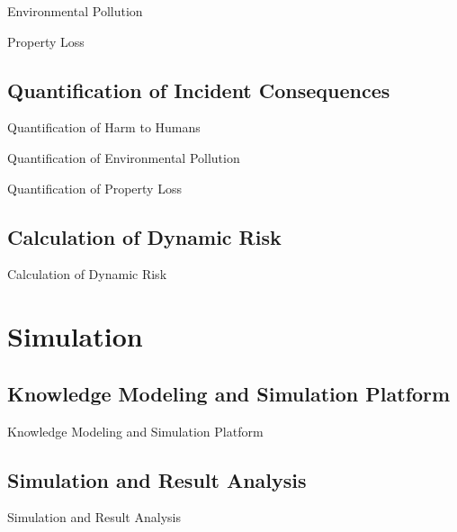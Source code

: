 \documentclass[10pt, compress]{beamer}
\begin{document}
\begin{frame}{Environmental Pollution}
\end{frame}

\begin{frame}{Property Loss}
\end{frame}

\subsection{Quantification of Incident Consequences}
\begin{frame}{Quantification of Harm to Humans}
\end{frame}

\begin{frame}{Quantification of Environmental Pollution}
\end{frame}

\begin{frame}{Quantification of Property Loss}
\end{frame}

\subsection{Calculation of Dynamic Risk}
\begin{frame}{Calculation of Dynamic Risk}
\end{frame}

\section{Simulation}
\subsection{Knowledge Modeling and Simulation Platform}
\begin{frame}{Knowledge Modeling and Simulation Platform}
\end{frame}

\subsection{Simulation and Result Analysis}
\begin{frame}{Simulation and Result Analysis}
\end{frame}
\end{document}
